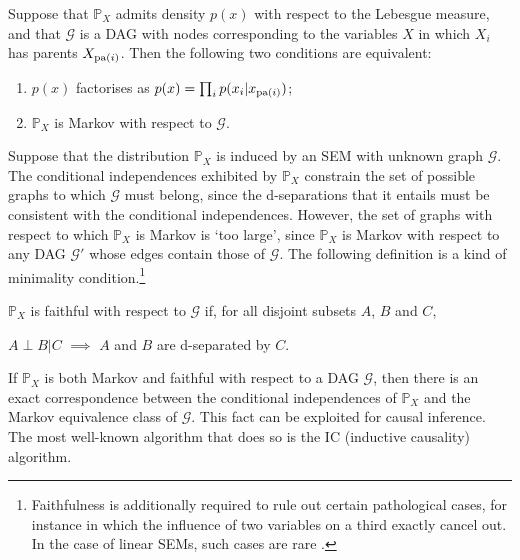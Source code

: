 \begin{theorem}\cite{lauritzen}
Suppose that $\mathbb{P}_X$ admits density $p(x)$ with respect to the Lebesgue measure, and that $\mathcal{G}$ is a DAG with nodes corresponding to the variables $X$ in which $X_i$ has parents $X_{\operatorname{pa}(i)}$. 
Then the following two conditions are equivalent:
\begin{enumerate}
\item $p(x)$ factorises as $p(x) = \prod_i p(x_i |x_{\operatorname{pa}(i)})$;
\item $\mathbb{P}_X$ is Markov with respect to $\mathcal{G}$.
\end{enumerate}
\end{theorem}
\medskip

Suppose that the distribution $\mathbb{P}_X$ is induced by an SEM with unknown graph $\mathcal{G}$.
The conditional independences exhibited by $\mathbb{P}_X$ constrain the set of possible graphs to which $\mathcal{G}$ must belong, since the d-separations that it entails must be consistent with the conditional independences.
However, the set of graphs with respect to which $\mathbb{P}_X$ is Markov is `too large', since $\mathbb{P}_X$ is Markov with respect to any DAG $\mathcal{G}'$ whose edges contain those of $\mathcal{G}$.
The following definition is a kind of minimality condition.\footnote{Faithfulness is additionally required to rule out certain pathological cases, for instance in which the influence of two variables on a third exactly cancel out. In the case of linear SEMs, such cases are rare \cite{lauritzen, see elem causality book ex. 6.34}.}
\\

\begin{definition}[Faithfulness]\cite{cite something?}
$\mathbb{P}_X$ is faithful with respect to $\mathcal{G}$ if, for all disjoint subsets
$A$, $B$ and $C$, 
\begin{center}
$A \perp B | C$ $\implies$ $A$ and $B$ are d-separated by $C$.
\end{center}
\end{definition}
\medskip

If $\mathbb{P}_X$ is both Markov and faithful with respect to a DAG $\mathcal{G}$, then there is an exact correspondence between the conditional independences of $\mathbb{P}_X$ and the Markov equivalence class of $\mathcal{G}$. 
This fact can be exploited for causal inference.
The most well-known algorithm that does so is the IC (inductive causality) algorithm.

